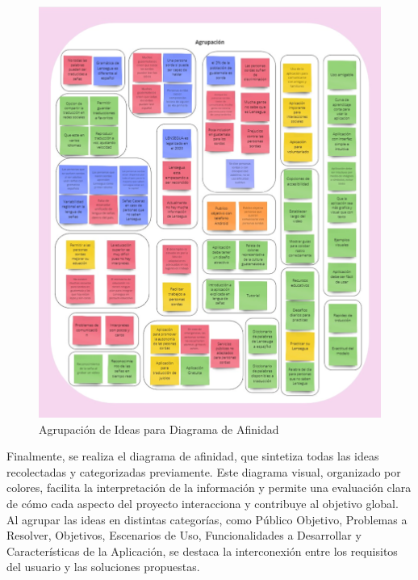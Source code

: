 \begin{figure} [H]
    \centering
    \includegraphics[width=0.75\linewidth]{figuras/agrupacion_diagrama_afinidad.png}
    \caption{Agrupación de Ideas para Diagrama de Afinidad}
    \label{fig:enter-label}
\end{figure}

Finalmente, se realiza el diagrama de afinidad, que sintetiza todas las ideas recolectadas y categorizadas previamente. Este diagrama visual, organizado por colores, facilita la interpretación de la información y permite una evaluación clara de cómo cada aspecto del proyecto interacciona y contribuye al objetivo global. Al agrupar las ideas en distintas categorías, como Público Objetivo, Problemas a Resolver, Objetivos, Escenarios de Uso, Funcionalidades a Desarrollar y Características de la Aplicación, se destaca la interconexión entre los requisitos del usuario y las soluciones propuestas.

